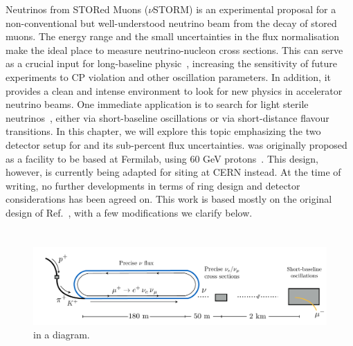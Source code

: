 \graphicspath{{}{nustorm/}{Diagrams/}}

Neutrinos from STORed Muons ($\nu$STORM) is an experimental proposal for a non-conventional but well-understood neutrino beam from the decay of stored muons. The energy range and the small uncertainties in the flux normalisation make \nus the ideal place to measure neutrino-nucleon cross sections. This can serve as a crucial input for long-baseline physic~\cite{Soler2015}, increasing the sensitivity of future experiments to CP violation and other oscillation parameters. In addition, it provides a clean and intense environment to look for new physics in accelerator neutrino beams. One immediate application is to search for light sterile neutrinos~\cite{Adey:2013pio,Adey:2014rfv}, either via short-baseline oscillations or via short-distance flavour transitions. In this chapter, we will explore this topic emphasizing the two detector setup for \nus and its sub-percent flux uncertainties. \nus was originally proposed as a facility to be based at Fermilab, using 60 GeV protons~\cite{Adey:2013pio}. This design, however, is currently being adapted for siting at CERN instead. At the time of writing, no further developments in terms of ring design and detector considerations has been agreed on. This work is based mostly on the original design of Ref.~\cite{Adey:2013pio}, with a few modifications we clarify below. 

\section{\nus}
%
\begin{figure}[t]
\centering
\includegraphics[width=\textwidth]{nustorm.pdf}
\caption[The \nus setup in a diagramatic representation.]{\nus in a diagram. \label{fig:nustorm_diagram}}
\end{figure}
%

